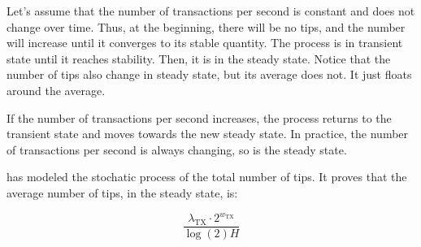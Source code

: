 Let's assume that the number of transactions per second is constant and does not change over time. Thus, at the beginning, there will be no tips, and the number will increase until it converges to its stable quantity. The process is in transient state until it reaches stability. Then, it is in the steady state. Notice that the number of tips also change in steady state, but its average does not. It just floats around the average.

If the number of transactions per second increases, the process returns to the transient state and moves towards the new steady state. In practice, the number of transactions per second is always changing, so is the steady state.

\citet{tangle2016} has modeled the stochatic process of the total number of tips. It proves that the average number of tips, in the steady state, is:

$$\frac{\lambda_\text{TX} \cdot 2^{w_\text{TX}}}{\log(2)H}$$


